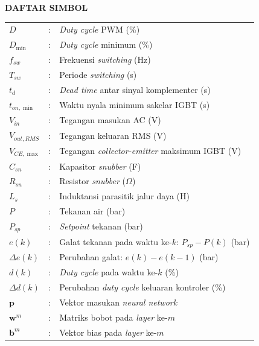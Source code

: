 \renewcommand{\arraystretch}{1.2}

\begin{center}
  \large\textbf{DAFTAR SIMBOL}
\end{center}


\vspace{2ex}

\noindent
\begin{tabularx}{\textwidth}{>{\itshape}l l X}
$D$             & : & \emph{Duty cycle} PWM (\%) \\
$D_{\min}$      & : & \emph{Duty cycle} minimum (\%) \\
$f_{sw}$        & : & Frekuensi \emph{switching} (Hz) \\
$T_{sw}$        & : & Periode \emph{switching} (s) \\
$t_d$           & : & \emph{Dead time} antar sinyal komplementer (s) \\
$t_{on,\min}$   & : & Waktu nyala minimum sakelar IGBT (s) \\
$V_{in}$        & : & Tegangan masukan AC (V) \\
$V_{out,RMS}$   & : & Tegangan keluaran RMS (V) \\
$V_{CE,\max}$   & : & Tegangan \emph{collector-emitter} maksimum IGBT (V) \\
$C_{sn}$        & : & Kapasitor \emph{snubber} (F) \\
$R_{sn}$        & : & Resistor \emph{snubber} ($\Omega$) \\
$L_s$           & : & Induktansi parasitik jalur daya (H) \\
$P$             & : & Tekanan air (bar) \\
$P_{sp}$        & : & \emph{Setpoint} tekanan (bar) \\
$e(k)$          & : & Galat tekanan pada waktu ke-$k$: $P_{sp} - P(k)$ (bar) \\
$\Delta e(k)$   & : & Perubahan galat: $e(k) - e(k-1)$ (bar) \\
$d(k)$          & : & \emph{Duty cycle} pada waktu ke-$k$ (\%) \\
$\Delta d(k)$   & : & Perubahan \emph{duty cycle} keluaran kontroler (\%) \\
$\mathbf{p}$    & : & Vektor masukan \emph{neural network} \\
$\mathbf{w}^m$  & : & Matriks bobot pada \emph{layer} ke-$m$ \\
$\mathbf{b}^m$  & : & Vektor bias pada \emph{layer} ke-$m$ \\

\end{tabularx}
